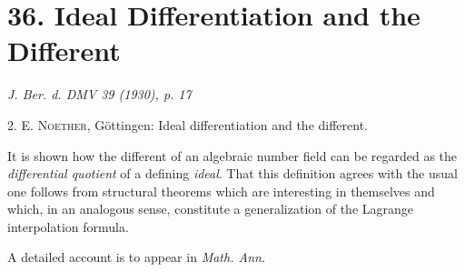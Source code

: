 \documentclass[11pt]{article}
\begin{document}
\section*{36. Ideal Differentiation and the Different}

\begin{center}
\emph{J. Ber. d. DMV 39 (1930), p. 17}
\end{center}

2. \textsc{E. Noether}, Göttingen: Ideal differentiation and the different.

It is shown how the different of an algebraic number field can be regarded as the \emph{differential quotient} of a defining \emph{ideal}. That this definition agrees with the usual one follows from structural theorems which are interesting in themselves and which, in an analogous sense, constitute a generalization of the Lagrange interpolation formula.

A detailed account is to appear in \emph{Math. Ann.}
\end{document}
